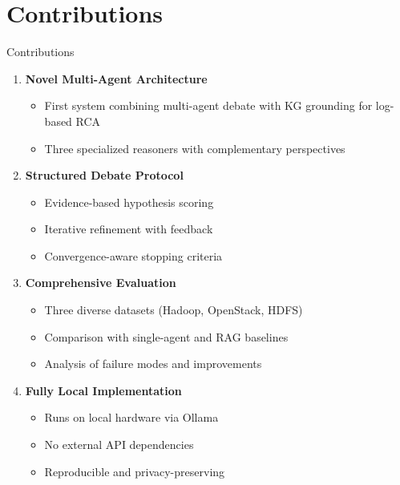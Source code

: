 \documentclass[aspectratio=169]{beamer}
\begin{document}
\section{Contributions}

\begin{frame}{Contributions}
\begin{enumerate}
    \item \textbf{Novel Multi-Agent Architecture}
    \begin{itemize}
        \item First system combining multi-agent debate with KG grounding for log-based RCA
        \item Three specialized reasoners with complementary perspectives
    \end{itemize}
    
    \vspace{0.5em}
    \item \textbf{Structured Debate Protocol}
    \begin{itemize}
        \item Evidence-based hypothesis scoring
        \item Iterative refinement with feedback
        \item Convergence-aware stopping criteria
    \end{itemize}
    
    \vspace{0.5em}
    \item \textbf{Comprehensive Evaluation}
    \begin{itemize}
        \item Three diverse datasets (Hadoop, OpenStack, HDFS)
        \item Comparison with single-agent and RAG baselines
        \item Analysis of failure modes and improvements
    \end{itemize}
    
    \vspace{0.5em}
    \item \textbf{Fully Local Implementation}
    \begin{itemize}
        \item Runs on local hardware via Ollama
        \item No external API dependencies
        \item Reproducible and privacy-preserving
    \end{itemize}
\end{enumerate}
\end{frame}
\end{document}
